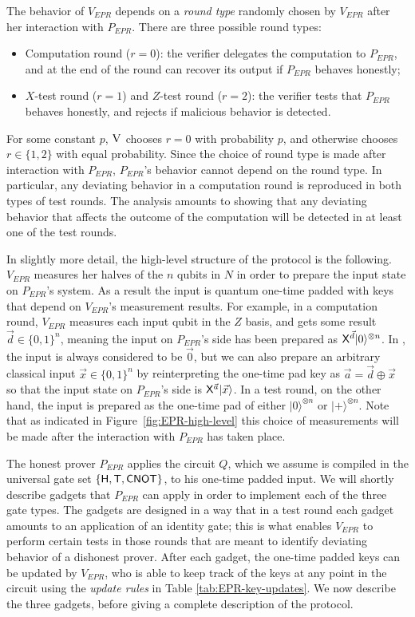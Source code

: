 \documentclass[11pt]{article}
\theoremstyle{remark}
\theoremstyle{definition}
\newcommand{\ket}[1]{|#1\rangle}
\newcommand{\ver}{\textsc{V}}
\begin{document}
The behavior of $V_{EPR}$ depends on a \emph{round type} randomly chosen by $V_{EPR}$ after her interaction with $P_{EPR}$. There are three possible round types:
\begin{itemize}[nolistsep]
\item Computation round ($r=0$): the verifier delegates the computation to $P_{EPR}$, and at the end of the round can recover its output if $P_{EPR}$ behaves honestly;
\item $X$-test round ($r=1$) and $Z$-test round ($r=2$): the verifier tests that  $P_{EPR}$  behaves honestly, and rejects if malicious behavior is detected.
\end{itemize}
For some constant $p$, $\ver$ chooses $r=0$ with probability $p$, and otherwise chooses $r\in\{1,2\}$ with equal probability. Since the choice of round type is made after interaction with $P_{EPR}$, $P_{EPR}$'s behavior cannot depend on the round type. In particular, any deviating behavior in a computation round is reproduced in both types of test rounds. The analysis amounts to showing that any deviating behavior that affects the outcome of the computation will be detected in at least one of the test rounds. 

In slightly more detail, the high-level structure of the protocol is the following. $V_{EPR}$ measures her halves of the $n$ qubits in $N$ in order to prepare the input state on $P_{EPR}$'s system. As a result the input is quantum one-time padded with keys that depend on $V_{EPR}$'s measurement results. For example, in a computation round, $V_{EPR}$ measures each input qubit in the $Z$ basis, and gets some result $\vec{d}\in\{0,1\}^n$, meaning the input on $P_{EPR}$'s side has been prepared as ${\sf X}^{\vec{d}}\ket{0}^{\otimes n}$. In \cite{broadbent15howtoverify}, the input is always considered to be $\vec{0}$, but we can also prepare an arbitrary classical input $\vec{x}\in\{0,1\}^n$ by reinterpreting the one-time pad key as $\vec{a}=\vec{d}\oplus \vec{x}$ so that the input state on $P_{EPR}$'s side is ${\sf X}^{\vec{a}}\ket{\vec{x}}$. In a test round, on the other hand, the input is prepared as the one-time pad of either $\ket{0}^{\otimes n}$ or $\ket{+}^{\otimes n}$. Note that as indicated in Figure~\ref{fig:EPR-high-level} this choice of measurements will be made after the interaction with $P_{EPR}$ has taken place.

The honest prover $P_{EPR}$ applies the circuit $Q$, which we assume is compiled in the universal gate set $\{{\sf H},{\sf T},{\sf CNOT}\}$, to his one-time padded input. We will shortly describe gadgets that $P_{EPR}$ can apply in order to implement each of the three gate types. The gadgets are designed in a way that in a test round each gadget amounts to an application of an identity gate; this is what enables $V_{EPR}$ to perform certain tests in those rounds that are meant to identify deviating behavior of a dishonest prover. After each gadget, the one-time padded keys can be updated by $V_{EPR}$, who is able to keep track of the keys at any point in the circuit using the \emph{update rules} in Table \ref{tab:EPR-key-updates}. We now describe the three gadgets, before giving a complete description of the protocol. 
\end{document}
